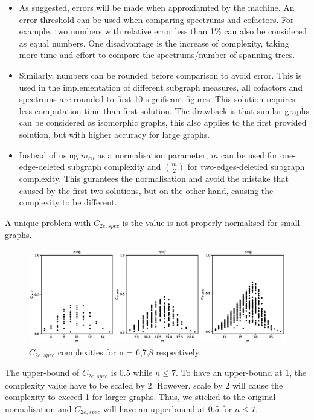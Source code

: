 \documentclass[12pt]{article}
\begin{document}
\begin{itemize}
    \item As suggested, errors will be made when approxiamted by the machine. An error threshold can be used when comparing spectrums and cofactors. For example, two numbers with relative error less than 1\% can also be considered as equal numbers. One disadvantage is the increase of complexity, taking more time and effort to compare the spectrums/number of spanning trees.
    \item Similarly, numbers can be rounded before comparison to avoid error. This is used in the implementation of different subgraph measures, all cofactors and spectrums are rounded to first 10 significant figures. This solution requires less computation time than first solution. The drawback is that similar graphs can be considered as isomorphic graphs, this also applies to the first provided solution, but with higher accuracy for large graphs.
    \item Instead of using $m_{cu}$ as a normalisation parameter, $m$ can be used for one-edge-deleted subgraph complexity and $\genfrac(){0pt}{2}{m}{2}$ for two-edges-deletied subgraph complexity. This gurantees the normalisation and avoid the mistake that caused by the first two solutions, but on the other hand, causing the complexity to be different.
\end{itemize}
A unique problem with $C_{2e,spec}$ is the value is not properly normalised for small graphs.

\begin{figure}[ht]
    \includegraphics[width = \textwidth]{c2espec.eps}
    \caption{$C_{2e,spec}$ complexities for n = 6,7,8 respectively.}
    \centering
\end{figure}
\noindent
The upper-bound of $C_{2e,spec}$ is 0.5 while $ n\leq7 $. To have an upper-bound at 1, the complexity value have to be scaled by 2. However, scale by 2 will cause the complexity to exceed 1 for larger graphs. Thus, we sticked to the original normalisation and $C_{2e,spec}$ will have an upperbound at 0.5 for $n \leq 7$.
\end{document}
